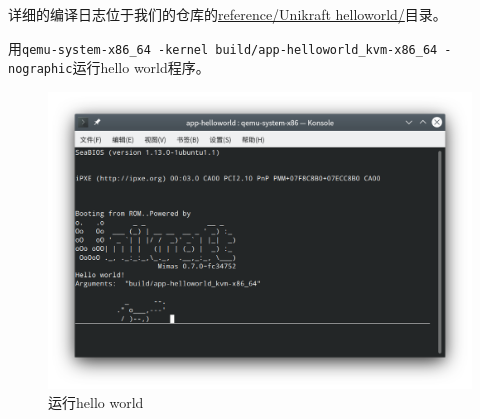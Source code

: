 \documentclass[UTF8,fontset=none,linespread=1.15]{ctexart}
\begin{document}
详细的编译日志位于我们的仓库的\href{https://github.com/OSH-2022/x-runikraft/tree/d22ccf0c1b248667148fd8953b71b6e0258de6a3/reference/Unikraft%20helloworld}{reference/Unikraft helloworld/}目录。

用\texttt{qemu-system-x86\_64 -kernel build/app-helloworld\_kvm-x86\_64 -nographic}\linebreak 运行hello world程序。

\begin{figure}[tbh!]
\centering
\includegraphics[width=0.9\linewidth]{assets/unikraft-run}
\caption{运行hello world}
\label{fig:unikraft-run}
\end{figure}
\end{document}
